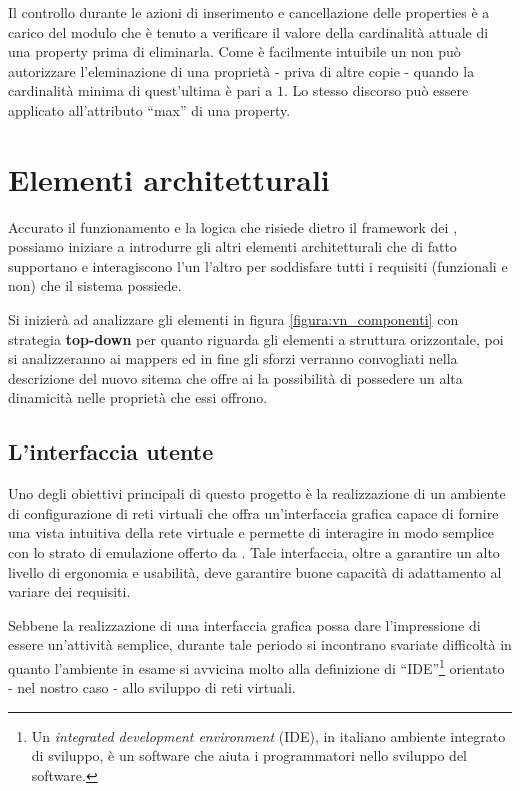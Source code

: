 Il controllo durante le azioni di inserimento e cancellazione delle properties è a carico del modulo che è tenuto a verificare il valore della cardinalità attuale di una property prima di eliminarla. Come è facilmente intuibile un \plugin{} non può autorizzare l'eleminazione di una proprietà - priva di altre copie - quando la cardinalità minima di quest'ultima è pari a $1$. Lo stesso discorso può essere applicato all'attributo ``max'' di una property.

\section{Elementi architetturali}
Accurato il funzionamento e la logica che risiede dietro il framework dei \plugin{}, possiamo iniziare a introdurre gli altri elementi architetturali che di fatto supportano e interagiscono l'un l'altro per soddisfare tutti i requisiti (funzionali e non) che il sistema possiede.

Si inizierà ad analizzare gli elementi in figura \ref{figura:vn_componenti} con strategia \textbf{top-down} per quanto riguarda gli elementi a struttura orizzontale, poi si analizzeranno ai mappers ed in fine gli sforzi verranno convogliati nella descrizione del nuovo sitema che offre ai \plugin{} la possibilità di possedere un alta dinamicità nelle proprietà che essi offrono.

\subsection{L'interfaccia utente}
Uno degli obiettivi principali di questo progetto è la realizzazione di un ambiente di configurazione di reti virtuali che offra un'interfaccia grafica capace di fornire una vista intuitiva della rete virtuale  e permette di interagire in modo semplice con lo strato di emulazione offerto da \netkit{}.
Tale interfaccia, oltre a garantire un alto livello di ergonomia e usabilità, deve garantire buone capacità di adattamento al variare dei requisiti.

Sebbene la realizzazione di una interfaccia grafica possa dare l'impressione di essere un'attività semplice, durante tale periodo si incontrano svariate difficoltà in quanto l'ambiente in esame si avvicina molto alla definizione di ``IDE''\footnote{Un \textit{integrated development environment} (IDE), in italiano ambiente integrato di sviluppo, è un software che aiuta i programmatori nello sviluppo del software.} orientato - nel nostro caso - allo sviluppo di reti virtuali.

